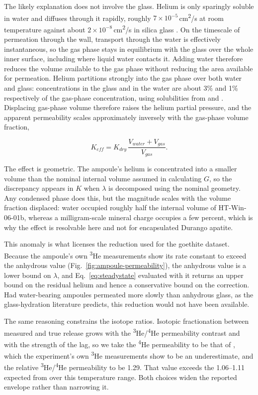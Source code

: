 The likely explanation does not involve the glass. Helium is only sparingly soluble in water and diffuses through it rapidly, roughly $7 \times 10^{-5}$\,cm\textsuperscript{2}/s at room temperature \citep{verhallen1984} against about $2 \times 10^{-8}$\,cm\textsuperscript{2}/s in silica glass \citep{swets1961}. On the timescale of permeation through the wall, transport through the water is effectively instantaneous, so the gas phase stays in equilibrium with the glass over the whole inner surface, including where liquid water contacts it. Adding water therefore reduces the volume available to the gas phase without reducing the area available for permeation. Helium partitions strongly into the gas phase over both water and glass: concentrations in the glass and in the water are about 3\% and 1\% respectively of the gas-phase concentration, using solubilities from \citet{sander2015} and \citet{swets1961}. Displacing gas-phase volume therefore raises the helium partial pressure, and the apparent permeability scales approximately inversely with the gas-phase volume fraction,

\begin{equation}
\label{eq:keff}
K_{eff} = K_{dry}\,\frac{V_{water} + V_{gas}}{V_{gas}} .
\end{equation}

The effect is geometric. The ampoule's helium is concentrated into a smaller volume than the nominal internal volume assumed in calculating $G$, so the discrepancy appears in $K$ when $\lambda$ is decomposed using the nominal geometry. Any condensed phase does this, but the magnitude scales with the volume fraction displaced: water occupied roughly half the internal volume of HT-Win-06-01b, whereas a milligram-scale mineral charge occupies a few percent, which is why the effect is resolvable here and not for encapsulated Durango apatite.

This anomaly is what licenses the reduction used for the goethite dataset. Because the ampoule's own \textsuperscript{3}He measurements show its rate constant to exceed the anhydrous value (Fig.~\ref{fig:ampoule-permeability}), the anhydrous value is a lower bound on $\lambda$, and Eq.~\eqref{eq:steadystate} evaluated with it returns an upper bound on the residual helium and hence a conservative bound on the correction. Had water-bearing ampoules permeated more slowly than anhydrous glass, as the glass-hydration literature predicts, this reduction would not have been available.

The same reasoning constrains the isotope ratios. Isotopic fractionation between measured and true release grows with the \textsuperscript{3}He/\textsuperscript{4}He permeability contrast and with the strength of the lag, so we take the \textsuperscript{4}He permeability to be that of \citet{swets1961}, which the experiment's own \textsuperscript{3}He measurements show to be an underestimate, and the relative \textsuperscript{3}He/\textsuperscript{4}He permeability to be 1.29. That value exceeds the 1.06--1.11 expected from \citet{jones1953} over this temperature range. Both choices widen the reported envelope rather than narrowing it.

